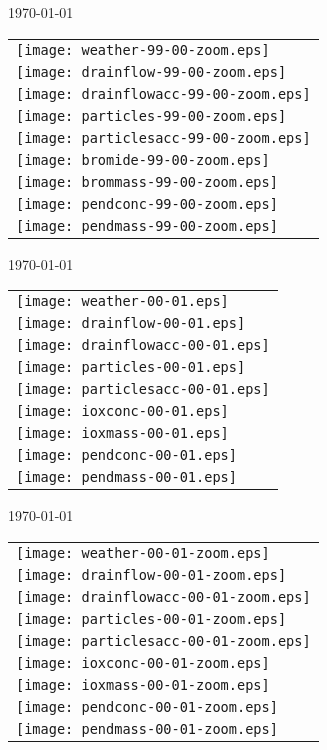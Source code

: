 \documentclass[a4paper]{article}
\begin{document}
\newpage
\today \\
%
\begin{tabular}{l}
\texttt{[image: weather-99-00-zoom.eps]} \\
\texttt{[image: drainflow-99-00-zoom.eps]} \\
\texttt{[image: drainflowacc-99-00-zoom.eps]} \\
\texttt{[image: particles-99-00-zoom.eps]} \\
\texttt{[image: particlesacc-99-00-zoom.eps]} \\
\texttt{[image: bromide-99-00-zoom.eps]} \\
\texttt{[image: brommass-99-00-zoom.eps]} \\
\texttt{[image: pendconc-99-00-zoom.eps]} \\
\texttt{[image: pendmass-99-00-zoom.eps]}
\end{tabular}

\newpage
\today \\
%
\begin{tabular}{l}
\texttt{[image: weather-00-01.eps]} \\
\texttt{[image: drainflow-00-01.eps]} \\
\texttt{[image: drainflowacc-00-01.eps]} \\
\texttt{[image: particles-00-01.eps]} \\
\texttt{[image: particlesacc-00-01.eps]} \\
\texttt{[image: ioxconc-00-01.eps]} \\
\texttt{[image: ioxmass-00-01.eps]} \\
\texttt{[image: pendconc-00-01.eps]} \\
\texttt{[image: pendmass-00-01.eps]}
\end{tabular}

\newpage
\today \\
%
\begin{tabular}{l}
\texttt{[image: weather-00-01-zoom.eps]} \\
\texttt{[image: drainflow-00-01-zoom.eps]} \\
\texttt{[image: drainflowacc-00-01-zoom.eps]} \\
\texttt{[image: particles-00-01-zoom.eps]} \\
\texttt{[image: particlesacc-00-01-zoom.eps]} \\
\texttt{[image: ioxconc-00-01-zoom.eps]} \\
\texttt{[image: ioxmass-00-01-zoom.eps]} \\
\texttt{[image: pendconc-00-01-zoom.eps]} \\
\texttt{[image: pendmass-00-01-zoom.eps]}
\end{tabular}
\end{document}

